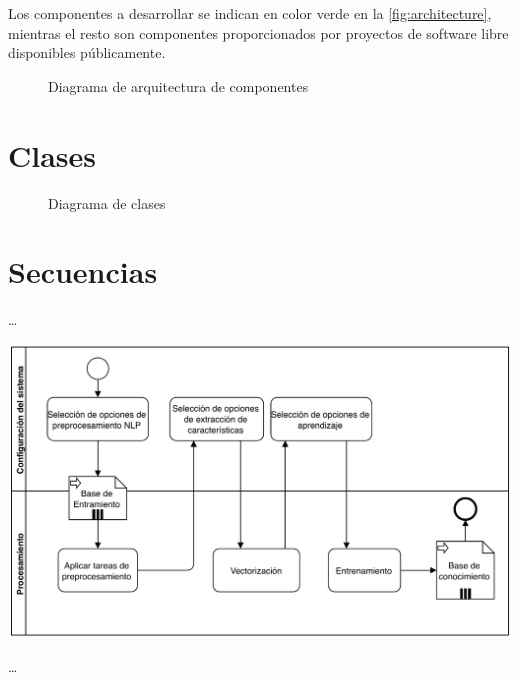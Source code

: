 Los componentes a desarrollar se indican en color verde en la \autoref{fig:architecture}, mientras el resto son componentes proporcionados por proyectos de software libre disponibles públicamente.

\begin{figure}[htbp]
\centering
\vspace{0.5cm}
\resizebox{0.75\textwidth}{!}{}
\caption{Diagrama de arquitectura de componentes}
\label{fig:architecture}
\end{figure}


\section{Clases}

\begin{landscape}
\begin{figure}[htbp]
\centering
\resizebox{!}{0.99\textwidth}{}
\caption{Diagrama de clases}
\label{fig:classes}
\end{figure}
\end{landscape}



\section{Secuencias}




\resizebox{0.5\textwidth}{!}{}

\ldots

\includegraphics[width=\textwidth]{bpmn-entrenamiento}

\ldots

